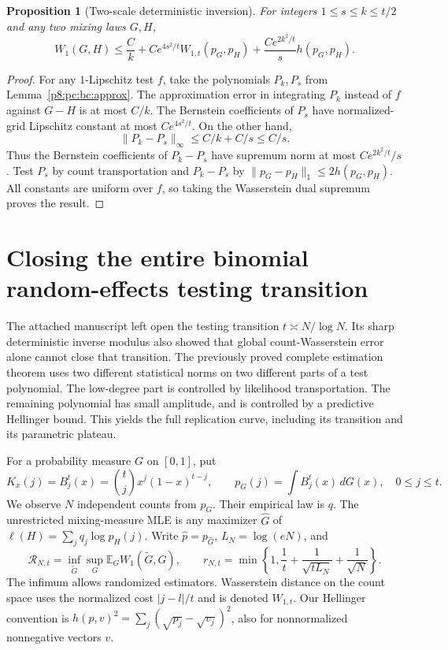 \documentclass[11pt,a4paper]{article}
\newtheorem{proposition}[theorem]{Proposition}
\theoremstyle{definition}
\theoremstyle{remark}
\numberwithin{equation}{section}
\begin{document}
\begin{proposition}[Two-scale deterministic inversion]
\label{p8:pc:bc:twoscale}
For integers $1\le s\le k\le t/2$ and any two mixing laws $G,H$,
\begin{equation}\label{p8:pc:bc:twoscaleineq}
 W_1(G,H)\le \frac Ck
       +Ce^{4s^2/t}W_{1,t}(p_G,p_H)
       +\frac{Ce^{2k^2/t}}s h(p_G,p_H).
\end{equation}
\end{proposition}
\begin{proof}
For any $1$-Lipschitz test $f$, take the polynomials $P_k,P_s$ from
Lemma~\ref{p8:pc:bc:approx}. The approximation error in integrating $P_k$
instead of $f$ against $G-H$ is at most $C/k$. The Bernstein coefficients
of $P_s$ have normalized-grid Lipschitz constant at most $Ce^{4s^2/t}$.
On the other hand,
\[
 \|P_k-P_s\|_\infty\le C/k+C/s\le C/s.
\]
Thus the Bernstein coefficients of $P_k-P_s$ have supremum norm at most
$Ce^{2k^2/t}/s$. Test $P_s$ by count transportation and $P_k-P_s$ by
$\|p_G-p_H\|_1\le2h(p_G,p_H)$. All constants are uniform over $f$,
so taking the Wasserstein dual supremum proves the result.
\end{proof}



\clearpage

\section{Closing the entire binomial random-effects testing transition}
\label{p8:p06:bm:sec}

The attached manuscript left open the testing
transition $t\asymp N/\log N$. Its sharp deterministic inverse modulus
also showed that global count-Wasserstein error alone cannot close that
transition. The previously proved complete estimation theorem uses two different statistical norms on two different
parts of a test polynomial. The low-degree part is controlled by
likelihood transportation. The remaining polynomial has small amplitude,
and is controlled by a predictive Hellinger bound. This yields the full
replication curve, including its transition and its parametric plateau.

For a probability measure $G$ on $[0,1]$, put
\[
 K_x(j)=B_j^t(x)=\binom tj x^j(1-x)^{t-j},\qquad
 p_G(j)=\int B_j^t(x)\,dG(x),\quad 0\le j\le t.
\]
We observe $N$ independent counts from $p_G$. Their empirical law is $q$.
The unrestricted mixing-measure MLE is any maximizer $\widehat G$ of
$\ell(H)=\sum_jq_j\log p_H(j)$. Write $\widehat p=p_{\widehat G}$,
$L_N=\log(eN)$, and
\[
 \mathcal R_{N,t}=\inf_{\widetilde G}\sup_G
       \mathbb E_G W_1(\widetilde G,G),\qquad
 r_{N,t}=\min\left\{1,\frac1t+
           \frac1{\sqrt{tL_N}}+\frac1{\sqrt N}\right\}.
\]
The infimum allows randomized estimators. Wasserstein distance on the
count space uses the normalized cost $|j-l|/t$ and is denoted $W_{1,t}$.
Our Hellinger convention is
$h(p,v)^2=\sum_j(\sqrt{p_j}-\sqrt{v_j})^2$, also for nonnormalized
nonnegative vectors $v$.
\end{document}
